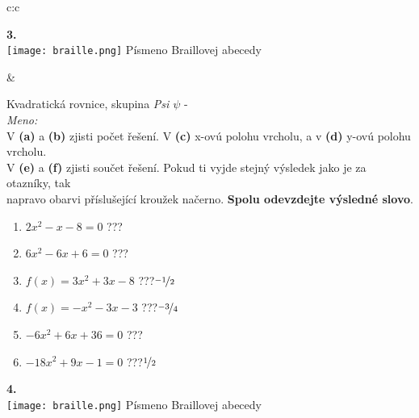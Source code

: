 \documentclass[10pt]{report}
\begin{document}
\begin{tabular}{c:c}
\begin{minipage}[c][99mm][t]{0.49\linewidth}
\begin{center}
\begin{minipage}{0.20\linewidth}
\begin{center}
{\Huge\bfseries 3.} \\[2mm]
\texttt{[image: braille.png]}
{\small Písmeno Braillovej abecedy}
\end{center}
\end{minipage}
\end{center}
\end{minipage}
&
\begin{minipage}[c][99mm][t]{0.49\linewidth}
\begin{center}
\vspace{7mm}
{\huge Kvadratická rovnice, skupina \textit{Psi $\psi$} -}\\[4.5mm]
\textit{Meno:}\phantom{xxxxxxxxxxxxxxxxxxxxxxxxxxxxxxxxxxxxxxxxxxxxxxxxxxxxxxxxxxxxxxxxx}\\[3.5mm]
V \textbf{(a)} a \textbf{(b)} zjisti počet řešení. V \textbf{(c)} x-ovú polohu vrcholu, a v \textbf{(d)} y-ovú polohu vrcholu.\\V \textbf{(e)} a \textbf{(f)} zjisti součet řešení. Pokud ti vyjde stejný výsledek jako je za otazníky, tak\\napravo obarvi příslušející kroužek načerno. \textbf{Spolu odevzdejte výsledné slovo}.\\[3mm]
\begin{minipage}{0.77\linewidth}
\begin{center}
\begin{varwidth}{\textwidth}
\begin{enumerate}
\large
\item $2x^2-x-8=0$\quad \dotfill\; ???\;\dotfill {}
\item $6x^2-6x+6=0$\quad \dotfill\; ???\;\dotfill {}
\item $f(x)=3x^2+3x-8$\quad \dotfill\; ???\;\dotfill \quad $\nicefrac{-1}{2}$
\item $f(x)=-x^2-3x-3$\quad \dotfill\; ???\;\dotfill \quad $\nicefrac{-3}{4}$
\item $-6x^2+6x+36=0$\quad \dotfill\; ???\;\dotfill {}
\item $-18x^2+9x-1=0$\quad \dotfill\; ???\;\dotfill \quad $\nicefrac{1}{2}$
\end{enumerate}
\end{varwidth}
\end{center}
\end{minipage}
\begin{minipage}{0.20\linewidth}
\begin{center}
{\Huge\bfseries 4.} \\[2mm]
\texttt{[image: braille.png]}
{\small Písmeno Braillovej abecedy}
\end{center}
\end{minipage}
\end{center}
\end{minipage}

\end{tabular}
\end{document}
